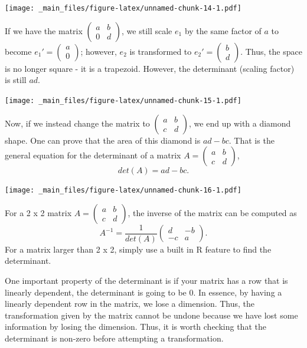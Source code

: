 \documentclass[
]{book}
\theoremstyle{definition}
\theoremstyle{definition}
\theoremstyle{definition}
\theoremstyle{definition}
\theoremstyle{remark}
\begin{document}
\texttt{[image: \_main\_files/figure-latex/unnamed-chunk-14-1.pdf]}

If we have the matrix \(\begin{pmatrix} a & b \\ 0 & d \end{pmatrix}\), we still scale \(e_1\) by the same factor of \(a\) to become \(e_1' = \begin{pmatrix} a \\ 0 \end{pmatrix}\); however, \(e_2\) is transformed to \(e_2' = \begin{pmatrix} b \\ d \end{pmatrix}\). Thus, the space is no longer square - it is a trapezoid. However, the determinant (scaling factor) is still \(ad\).

\texttt{[image: \_main\_files/figure-latex/unnamed-chunk-15-1.pdf]}

Now, if we instead change the matrix to \(\begin{pmatrix} a & b \\ c & d \end{pmatrix}\), we end up with a diamond shape. One can prove that the area of this diamond is \(ad - bc\). That is the general equation for the determinant of a matrix \(A = \begin{pmatrix} a & b \\ c & d \end{pmatrix}\), \[det(A) = ad-bc.\]

\texttt{[image: \_main\_files/figure-latex/unnamed-chunk-16-1.pdf]}

For a 2 x 2 matrix \(A = \begin{pmatrix} a & b \\ c & d \end{pmatrix}\), the inverse of the matrix can be computed as \[A^{-1} = \dfrac{1}{det(A)}\begin{pmatrix} d & -b \\ -c & a \end{pmatrix}.\] For a matrix larger than 2 x 2, simply use a built in R feature to find the determinant.

One important property of the determinant is if your matrix has a row that is linearly dependent, the determinant is going to be 0. In essence, by having a linearly dependent row in the matrix, we lose a dimension. Thus, the transformation given by the matrix cannot be undone because we have lost some information by losing the dimension. Thus, it is worth checking that the determinant is non-zero before attempting a transformation.
\end{document}

